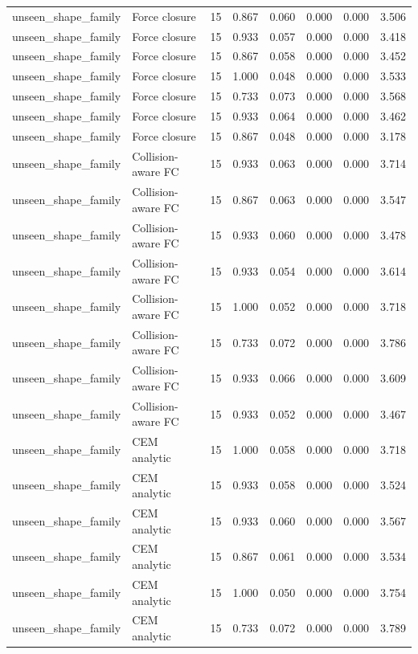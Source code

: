 {\begin{longtable}{llrrrrrr}
unseen\_shape\_family & Force closure & 15 & 0.867 & 0.060 & 0.000 & 0.000 & 3.506 \\
unseen\_shape\_family & Force closure & 15 & 0.933 & 0.057 & 0.000 & 0.000 & 3.418 \\
unseen\_shape\_family & Force closure & 15 & 0.867 & 0.058 & 0.000 & 0.000 & 3.452 \\
unseen\_shape\_family & Force closure & 15 & 1.000 & 0.048 & 0.000 & 0.000 & 3.533 \\
unseen\_shape\_family & Force closure & 15 & 0.733 & 0.073 & 0.000 & 0.000 & 3.568 \\
unseen\_shape\_family & Force closure & 15 & 0.933 & 0.064 & 0.000 & 0.000 & 3.462 \\
unseen\_shape\_family & Force closure & 15 & 0.867 & 0.048 & 0.000 & 0.000 & 3.178 \\
unseen\_shape\_family & Collision-aware FC & 15 & 0.933 & 0.063 & 0.000 & 0.000 & 3.714 \\
unseen\_shape\_family & Collision-aware FC & 15 & 0.867 & 0.063 & 0.000 & 0.000 & 3.547 \\
unseen\_shape\_family & Collision-aware FC & 15 & 0.933 & 0.060 & 0.000 & 0.000 & 3.478 \\
unseen\_shape\_family & Collision-aware FC & 15 & 0.933 & 0.054 & 0.000 & 0.000 & 3.614 \\
unseen\_shape\_family & Collision-aware FC & 15 & 1.000 & 0.052 & 0.000 & 0.000 & 3.718 \\
unseen\_shape\_family & Collision-aware FC & 15 & 0.733 & 0.072 & 0.000 & 0.000 & 3.786 \\
unseen\_shape\_family & Collision-aware FC & 15 & 0.933 & 0.066 & 0.000 & 0.000 & 3.609 \\
unseen\_shape\_family & Collision-aware FC & 15 & 0.933 & 0.052 & 0.000 & 0.000 & 3.467 \\
unseen\_shape\_family & CEM analytic & 15 & 1.000 & 0.058 & 0.000 & 0.000 & 3.718 \\
unseen\_shape\_family & CEM analytic & 15 & 0.933 & 0.058 & 0.000 & 0.000 & 3.524 \\
unseen\_shape\_family & CEM analytic & 15 & 0.933 & 0.060 & 0.000 & 0.000 & 3.567 \\
unseen\_shape\_family & CEM analytic & 15 & 0.867 & 0.061 & 0.000 & 0.000 & 3.534 \\
unseen\_shape\_family & CEM analytic & 15 & 1.000 & 0.050 & 0.000 & 0.000 & 3.754 \\
unseen\_shape\_family & CEM analytic & 15 & 0.733 & 0.072 & 0.000 & 0.000 & 3.789 \\

\end{longtable}}
